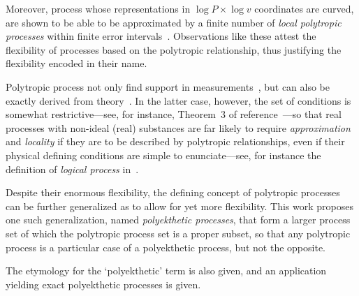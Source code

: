     Moreover, process whose representations in $\log P \times \log v$  coordinates  are  curved,
    are shown to be able to be  approximated  by  a  finite  number  of  \emph{local  polytropic
    processes} within  finite  error  intervals~\cite{2020-NaaktgeborenC-engrXiv}.  Observations
    like these attest the flexibility of processes based on the  polytropic  relationship,  thus
    justifying the flexibility encoded in their name.

    Polytropic process not only find support  in  measurements~\cite{2013-CengelYA+BolesMA-AMGH,
    2002-MoranMJ+ShapiroHN-LTC,  1985-WylenG-Wiley},  but  can  also  be  exactly  derived  from
    theory~\cite{2012-ChristiansJ-IntJMechEngEduc, 2020-NaaktgeborenC-engrXiv}.  In  the  latter
    case, however, the set of conditions is somewhat restrictive---see, for instance,  Theorem~3
    of  reference~\cite{2020-NaaktgeborenC-engrXiv}---so  that  real  processes  with  non-ideal
    (real) substances are far likely to require \emph{approximation} and \emph{locality} if they
    are to be described by polytropic relationships, even if their physical defining  conditions
    are simple to  enunciate---see,  for  instance  the  definition  of  \emph{logical  process}
    in~\cite{2020-NaaktgeborenC-engrXiv}.

    Despite their enormous flexibility, the defining concept  of  polytropic  processes  can  be
    further generalized as to allow for yet  more  flexibility.  This  work  proposes  one  such
    generalization, named \emph{polyekthetic processes}, that form a larger process set of which
    the polytropic process set is  a  proper  subset,  so  that  any  polytropic  process  is  a
    particular case of a polyekthetic process, but not the opposite.

    The etymology for the `polyekthetic' term is also given, and an application  yielding  exact
    polyekthetic processes is given.


